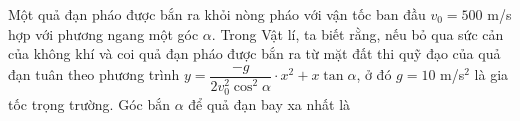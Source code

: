 \begin{ex}%
	Một quả đạn pháo được bắn ra khỏi nòng pháo với vận tốc ban đầu $ v_0=500$ m/s hợp với phương ngang một góc $ \alpha $. Trong Vật lí, ta biết rằng, nếu bỏ qua sức cản của không khí và coi quả đạn pháo được bắn ra từ mặt đất thi quỹ đạo của quả đạn tuân theo phương trình $ y=\dfrac{-g}{2v_0^2\cos^2\alpha}\cdot x^2+x\tan \alpha $, ở đó $g = 10$ m/s$ ^2 $ là gia tốc trọng trường. Góc bắn $ \alpha $ để quả đạn bay xa nhất là
\end{ex}


